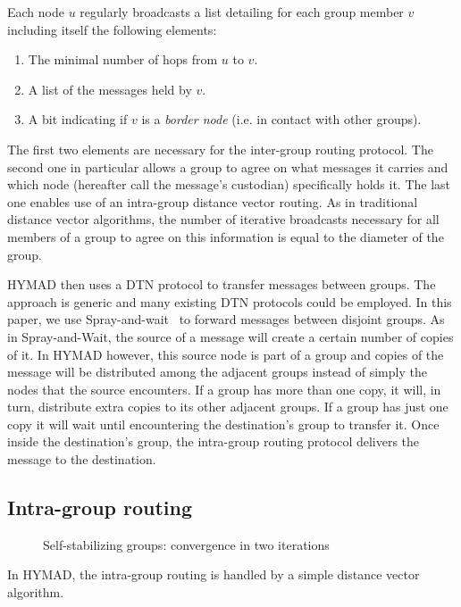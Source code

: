 \documentclass[10pt,twocolumn,letterpaper]{article}
\begin{document}
Each node $u$ regularly broadcasts a list detailing for each group
member $v$ including itself the following elements:

\begin{enumerate}
\item The minimal number of hops from $u$ to $v$.
\item A list of the messages held by $v$.
\item A bit indicating if $v$ is a \textit{border node}
  (i.e. in contact with other groups).
\end{enumerate}

The first two elements are necessary for the inter-group routing
protocol. The second one in particular allows a group to agree on what
messages it carries and which node (hereafter call the
message's custodian) specifically holds it. The last one enables use of an
intra-group distance vector routing. As in traditional distance vector
algorithms, the number of iterative broadcasts necessary for all
members of a group to agree on this information is equal to the
diameter of the group. 

HYMAD then uses a DTN protocol to transfer messages between
groups. The approach is generic and many existing DTN protocols could be employed.
In this paper, we use Spray-and-wait~\cite{spyro_sw} to forward messages
between disjoint groups. As in Spray-and-Wait, the source of a message
will create a certain number of copies of it. In HYMAD however, this
source node is part of a group and copies of the message will be
distributed among the adjacent groups instead of simply the nodes that
the source encounters. If a group has more than one copy, it will, in
turn, distribute extra copies to its other adjacent groups. If a group
has just one copy it will wait until encountering the destination's
group to transfer it. Once inside the destination's group, the
intra-group routing protocol delivers the message to the destination.

\subsection{Intra-group routing}
\label{intra_group}

\begin{figure}
  \centering
  \caption{Self-stabilizing groups: convergence in two iterations}
  \label{group_spread}
\end{figure}

In HYMAD, the intra-group routing is handled by a simple distance
vector algorithm. 
\end{document}
